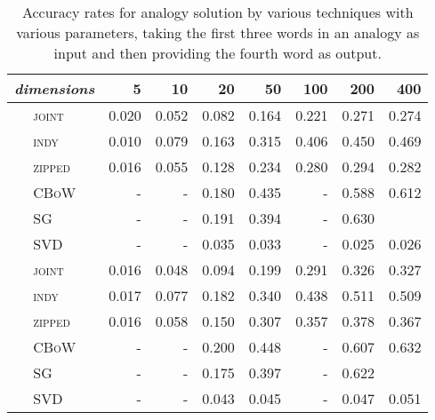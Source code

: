 \begin{table}
\centering
\begin{tabular}{clrrrrrrr}
\hline
\multicolumn{2}{l}{\emph{dimensions}} & 5 & 10 & 20 & 50 & 100 & 200 & 400 \\
\hline
\parbox[t]{2mm}{} & \textsc{joint} & 0.020 & 0.052 & 0.082 & 0.164 & 0.221 & 0.271 & 0.274 \\
& \textsc{indy} & 0.010 & 0.079 & 0.163 & 0.315 & 0.406 & 0.450 & 0.469 \\
& \textsc{zipped} & 0.016 & 0.055 & 0.128 & 0.234 & 0.280 & 0.294 & 0.282 \\
& \textsc{CBoW} & - & - & 0.180 & 0.435 & - & 0.588 & 0.612 \\
& \textsc{SG} & - & - & 0.191 & 0.394 & - & 0.630 &  \\
& \textsc{SVD} & - & - & 0.035 & 0.033 & - & 0.025 & 0.026 \\
\hline
\parbox[t]{2mm}{} & \textsc{joint} & 0.016 & 0.048 & 0.094 & 0.199 & 0.291 & 0.326 & 0.327 \\
& \textsc{indy} & 0.017 & 0.077 & 0.182 & 0.340 & 0.438 & 0.511 & 0.509 \\
& \textsc{zipped} & 0.016 & 0.058 & 0.150 & 0.307 & 0.357 & 0.378 & 0.367 \\
& \textsc{CBoW} & - & - & 0.200 & 0.448 & - & 0.607 & 0.632 \\
& \textsc{SG} & - & - & 0.175 & 0.397 & - & 0.622 &  \\
& \textsc{SVD} & - & - & 0.043 & 0.045 & - & 0.047 & 0.051 \\
\hline
\end{tabular}
\caption[Solving Analogies]{Accuracy rates for analogy solution by various techniques with various parameters, taking the first three words in an analogy as input and then providing the fourth word as output.}
\label{tab:solutions}
\end{table}

